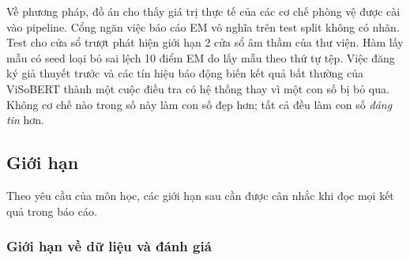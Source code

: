 Về phương pháp, đồ án cho thấy giá trị thực tế của các cơ chế phòng vệ được cài vào pipeline.
Cổng  ngăn việc báo cáo EM vô nghĩa trên test split không có nhãn. Test
cho cửa sổ trượt phát hiện giới hạn 2 cửa sổ âm thầm của thư viện. Hàm lấy mẫu có seed loại bỏ
sai lệch 10 điểm EM do lấy mẫu theo thứ tự tệp. Việc đăng ký giả thuyết trước và các tín hiệu
báo động biến kết quả bất thường của ViSoBERT thành một cuộc điều tra có hệ thống thay vì một con
số bị bỏ qua. Không cơ chế nào trong số này làm con số đẹp hơn; tất cả đều làm con số \emph{đáng
tin} hơn.

\subsection{Giới hạn}
\label{sec:limitations}

Theo yêu cầu của môn học, các giới hạn sau cần được cân nhắc khi đọc mọi kết quả trong báo cáo.

\subsubsection{Giới hạn về dữ liệu và đánh giá}

